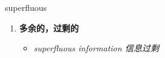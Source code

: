 
\begin{frame}
{\huge superfluous}
\begin{center}
\begin{enumerate}\Large
  \item \textbf{多余的，过剩的}
  \begin{itemize}
    \item \em{\Large{superfluous information 信息过剩}}
  \end{itemize}
\end{enumerate}
\end{center}
\end{frame}
